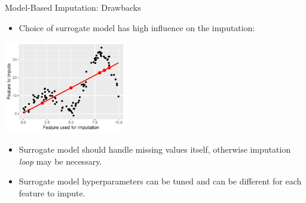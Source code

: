 \documentclass[11pt,compress,t,notes=noshow, xcolor=table]{beamer}
\begin{document}
\begin{frame}{Model-Based Imputation: Drawbacks}

    \begin{itemize}
        \item Choice of surrogate model has high influence on the imputation:
    \end{itemize}
    
    \begin{center}
        \includegraphics[width=0.4\textwidth]{figure/surrogate_model_influence}
    \end{center}
    
    \begin{itemize}
        \item Surrogate model should handle missing values itself, otherwise imputation \textit{loop} may be necessary.
        
        \item Surrogate model hyperparameters can be tuned and can be different for each feature to impute.
    \end{itemize}

\end{frame}

\endlecture
\end{document}

